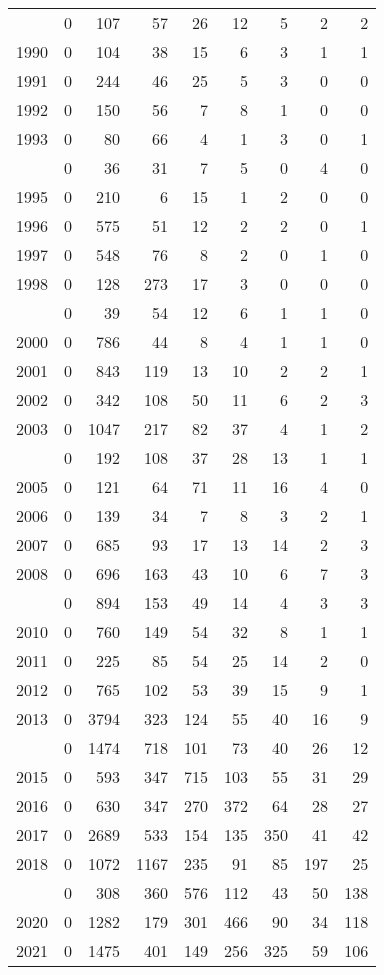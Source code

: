 \documentclass[
]{article}
\begin{document}
\begin{longtable}[t]{lrrrrrrrr}
\endfoot
\bottomrule
\endlastfoot
1989 & 0 & 107 & 57 & 26 & 12 & 5 & 2 & 2\\
1990 & 0 & 104 & 38 & 15 & 6 & 3 & 1 & 1\\
1991 & 0 & 244 & 46 & 25 & 5 & 3 & 0 & 0\\
1992 & 0 & 150 & 56 & 7 & 8 & 1 & 0 & 0\\
1993 & 0 & 80 & 66 & 4 & 1 & 3 & 0 & 1\\
\addlinespace
1994 & 0 & 36 & 31 & 7 & 5 & 0 & 4 & 0\\
1995 & 0 & 210 & 6 & 15 & 1 & 2 & 0 & 0\\
1996 & 0 & 575 & 51 & 12 & 2 & 2 & 0 & 1\\
1997 & 0 & 548 & 76 & 8 & 2 & 0 & 1 & 0\\
1998 & 0 & 128 & 273 & 17 & 3 & 0 & 0 & 0\\
\addlinespace
1999 & 0 & 39 & 54 & 12 & 6 & 1 & 1 & 0\\
2000 & 0 & 786 & 44 & 8 & 4 & 1 & 1 & 0\\
2001 & 0 & 843 & 119 & 13 & 10 & 2 & 2 & 1\\
2002 & 0 & 342 & 108 & 50 & 11 & 6 & 2 & 3\\
2003 & 0 & 1047 & 217 & 82 & 37 & 4 & 1 & 2\\
\addlinespace
2004 & 0 & 192 & 108 & 37 & 28 & 13 & 1 & 1\\
2005 & 0 & 121 & 64 & 71 & 11 & 16 & 4 & 0\\
2006 & 0 & 139 & 34 & 7 & 8 & 3 & 2 & 1\\
2007 & 0 & 685 & 93 & 17 & 13 & 14 & 2 & 3\\
2008 & 0 & 696 & 163 & 43 & 10 & 6 & 7 & 3\\
\addlinespace
2009 & 0 & 894 & 153 & 49 & 14 & 4 & 3 & 3\\
2010 & 0 & 760 & 149 & 54 & 32 & 8 & 1 & 1\\
2011 & 0 & 225 & 85 & 54 & 25 & 14 & 2 & 0\\
2012 & 0 & 765 & 102 & 53 & 39 & 15 & 9 & 1\\
2013 & 0 & 3794 & 323 & 124 & 55 & 40 & 16 & 9\\
\addlinespace
2014 & 0 & 1474 & 718 & 101 & 73 & 40 & 26 & 12\\
2015 & 0 & 593 & 347 & 715 & 103 & 55 & 31 & 29\\
2016 & 0 & 630 & 347 & 270 & 372 & 64 & 28 & 27\\
2017 & 0 & 2689 & 533 & 154 & 135 & 350 & 41 & 42\\
2018 & 0 & 1072 & 1167 & 235 & 91 & 85 & 197 & 25\\
\addlinespace
2019 & 0 & 308 & 360 & 576 & 112 & 43 & 50 & 138\\
2020 & 0 & 1282 & 179 & 301 & 466 & 90 & 34 & 118\\
2021 & 0 & 1475 & 401 & 149 & 256 & 325 & 59 & 106\\*
\end{longtable}
\end{document}
